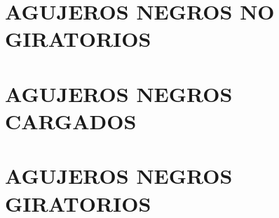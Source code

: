 \documentclass[../main]{subfiles}
\begin{document}

\chapter{AGUJEROS NEGROS NO GIRATORIOS}

\newpage


\chapter{AGUJEROS NEGROS CARGADOS}

\newpage


\chapter{AGUJEROS NEGROS GIRATORIOS}

\newpage
\end{document}
